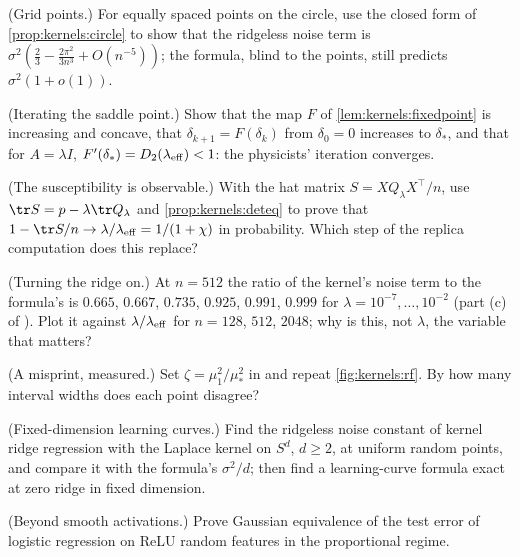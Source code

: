\begin{refsection}
\begin{exercises}
\item \byhand (Grid points.) For equally spaced points on the circle, use the closed form of \cref{prop:kernels:circle} to show that the ridgeless noise term is $\sigma^2(\frac23-\frac{2\pi^2}{3n^3}+O(n^{-5}))$; the formula, blind to the points, still predicts $\sigma^2(1+o(1))$.\label{ex:kernels:grid}

\item \translate (Iterating the saddle point.) Show that the map $F$ of \cref{lem:kernels:fixedpoint} is increasing and concave, that $\delta_{k+1}=F(\delta_k)$ from $\delta_0=0$ increases to $\delta_*$, and that for $A=\lambda I$, $F'(\delta_*)=D_2(\lambda_{\mathrm{eff}})<1$: the physicists' iteration converges.

\item \translate (The susceptibility is observable.) With the hat matrix $S=XQ_\lambda X^\top/n$, use $\tr S=p-\lambda\tr Q_\lambda$ and \cref{prop:kernels:deteq} to prove that $1-\tr S/n\to\lambda/\kernelsleff=1/(1+\chi)$ in probability. Which step of the replica computation does this replace?

\item \measurement (Turning the ridge on.) At $n=512$ the ratio of the kernel's noise term to the formula's is $0.665$, $0.667$, $0.735$, $0.925$, $0.991$, $0.999$ for $\lambda=10^{-7},\dots,10^{-2}$ (part (c) of ). Plot it against $\lambda/\lambda_{\mathrm{eff}}$ for $n=128$, $512$, $2048$; why is this, not $\lambda$, the variable that matters?\label{ex:kernels:sweep}

\item \measurement (A misprint, measured.) Set $\zeta=\mu_1^2/\mu_*^2$ in  and repeat \cref{fig:kernels:rf}. By how many interval widths does each point disagree?

\item \research\hard (Fixed-dimension learning curves.) Find the ridgeless noise constant of kernel ridge regression with the Laplace kernel on $S^d$, $d\ge2$, at uniform random points, and compare it with the formula's $\sigma^2/d$; then find a learning-curve formula exact at zero ridge in fixed dimension. \label{ex:kernels:research}

\item \research\harder (Beyond smooth activations.) Prove Gaussian equivalence of the test error of logistic regression on ReLU random features in the proportional regime.
\end{exercises}


\end{refsection}
